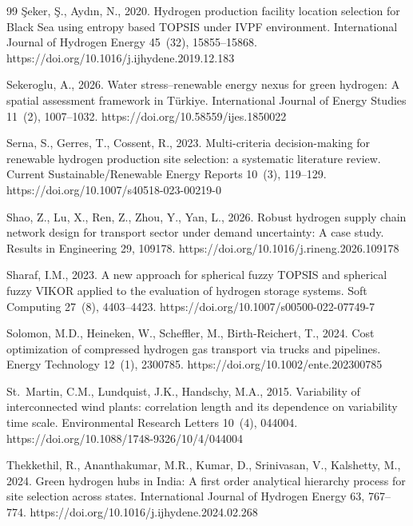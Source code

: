 \documentclass[preprint,12pt,authoryear]{elsarticle}
\begin{document}
\begin{thebibliography}{99}
{\c{S}}eker, {\c{S}}., Ayd{\i}n, N., 2020. Hydrogen production facility location selection for Black Sea using entropy based TOPSIS under IVPF environment. International Journal of Hydrogen Energy 45~(32), 15855--15868. https://doi.org/10.1016/j.ijhydene.2019.12.183

Sekeroglu, A., 2026. Water stress--renewable energy nexus for green hydrogen: A spatial assessment framework in T{\"u}rkiye. International Journal of Energy Studies 11~(2), 1007--1032. https://doi.org/10.58559/ijes.1850022

Serna, S., Gerres, T., Cossent, R., 2023. Multi-criteria decision-making for renewable hydrogen production site selection: a systematic literature review. Current Sustainable/Renewable Energy Reports 10~(3), 119--129. https://doi.org/10.1007/s40518-023-00219-0

Shao, Z., Lu, X., Ren, Z., Zhou, Y., Yan, L., 2026. Robust hydrogen supply chain network design for transport sector under demand uncertainty: A case study. Results in Engineering 29, 109178. https://doi.org/10.1016/j.rineng.2026.109178

Sharaf, I.M., 2023. A new approach for spherical fuzzy TOPSIS and spherical fuzzy VIKOR applied to the evaluation of hydrogen storage systems. Soft Computing 27~(8), 4403--4423. https://doi.org/10.1007/s00500-022-07749-7

Solomon, M.D., Heineken, W., Scheffler, M., Birth-Reichert, T., 2024. Cost optimization of compressed hydrogen gas transport via trucks and pipelines. Energy Technology 12~(1), 2300785. https://doi.org/10.1002/ente.202300785

St.~Martin, C.M., Lundquist, J.K., Handschy, M.A., 2015. Variability of interconnected wind plants: correlation length and its dependence on variability time scale. Environmental Research Letters 10~(4), 044004. https://doi.org/10.1088/1748-9326/10/4/044004


Thekkethil, R., Ananthakumar, M.R., Kumar, D., Srinivasan, V., Kalshetty, M., 2024. Green hydrogen hubs in India: A first order analytical hierarchy process for site selection across states. International Journal of Hydrogen Energy 63, 767--774. https://doi.org/10.1016/j.ijhydene.2024.02.268


\end{thebibliography}
\end{document}
